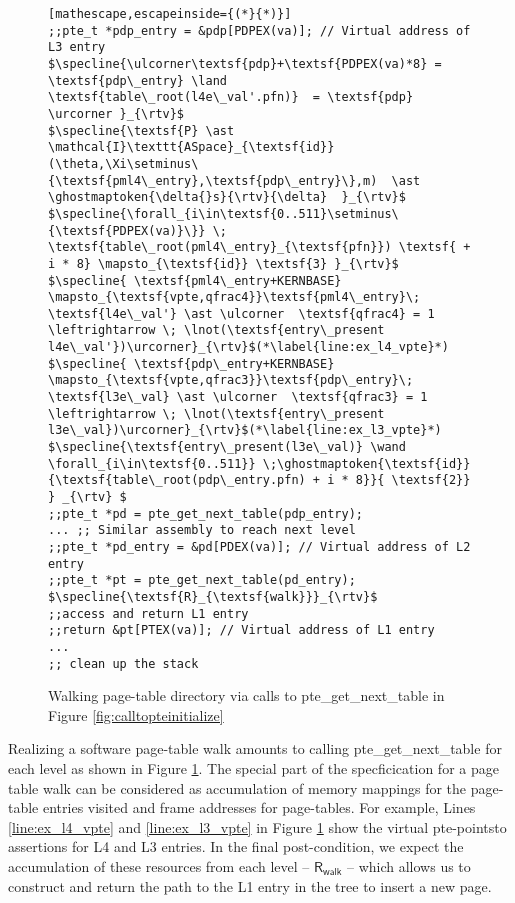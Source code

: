 \begin{figure}
\begin{lstlisting}[mathescape,escapeinside={(*}{*)}]
;;pte_t *pdp_entry = &pdp[PDPEX(va)]; // Virtual address of L3 entry
$\specline{\ulcorner\textsf{pdp}+\textsf{PDPEX(va)*8} = \textsf{pdp\_entry} \land \textsf{table\_root(l4e\_val'.pfn)}  = \textsf{pdp} \urcorner }_{\rtv}$
$\specline{\textsf{P} \ast \mathcal{I}\texttt{ASpace}_{\textsf{id}}(\theta,\Xi\setminus\{\textsf{pml4\_entry},\textsf{pdp\_entry}\},m)  \ast \ghostmaptoken{\delta{}s}{\rtv}{\delta}  }_{\rtv}$
$\specline{\forall_{i\in\textsf{0..511}\setminus\{\textsf{PDPEX(va)}\}} \; \textsf{table\_root(pml4\_entry}_{\textsf{pfn}}) \textsf{ + i * 8} \mapsto_{\textsf{id}} \textsf{3} }_{\rtv}$
$\specline{ \textsf{pml4\_entry+KERNBASE} \mapsto_{\textsf{vpte,qfrac4}}\textsf{pml4\_entry}\; \textsf{l4e\_val'} \ast \ulcorner  \textsf{qfrac4} = 1 \leftrightarrow \; \lnot(\textsf{entry\_present l4e\_val'})\urcorner}_{\rtv}$(*\label{line:ex_l4_vpte}*)
$\specline{ \textsf{pdp\_entry+KERNBASE} \mapsto_{\textsf{vpte,qfrac3}}\textsf{pdp\_entry}\; \textsf{l3e\_val} \ast \ulcorner  \textsf{qfrac3} = 1 \leftrightarrow \; \lnot(\textsf{entry\_present l3e\_val})\urcorner}_{\rtv}$(*\label{line:ex_l3_vpte}*)
$\specline{\textsf{entry\_present(l3e\_val)} \wand \forall_{i\in\textsf{0..511}} \;\ghostmaptoken{\textsf{id}}{\textsf{table\_root(pdp\_entry.pfn) + i * 8}}{ \textsf{2}} } _{\rtv} $
;;pte_t *pd = pte_get_next_table(pdp_entry);
... ;; Similar assembly to reach next level
;;pte_t *pd_entry = &pd[PDEX(va)]; // Virtual address of L2 entry
;;pte_t *pt = pte_get_next_table(pd_entry);
$\specline{\textsf{R}_{\textsf{walk}}}_{\rtv}$
;;access and return L1 entry
;;return &pt[PTEX(va)]; // Virtual address of L1 entry
...
;; clean up the stack 
\end{lstlisting}
\vspace{-1em}
\caption{Walking page-table directory via calls to \textsf{pte\_get\_next\_table} in Figure \ref{fig:calltopteinitialize}}
\label{walkpgdir}
\end{figure}

Realizing a software page-table walk amounts to calling \textsf{pte\_get\_next\_table} for each level as shown in Figure \ref{walkpgdir}. 
The special part of the specficication for a page table walk can be considered as accumulation of memory mappings for the page-table entries 
visited and frame addresses for page-tables. 
For example, Lines \ref{line:ex_l4_vpte} and \ref{line:ex_l3_vpte} in Figure \ref{walkpgdir} show the virtual pte-pointsto assertions for L4 and L3 entries.
In the final post-condition, we expect the accumulation of these resources from each level -- $\textsf{R}_{\textsf{walk}}$ -- 
which allows us to construct and return the path to the L1 entry in the tree to insert a new page.  

